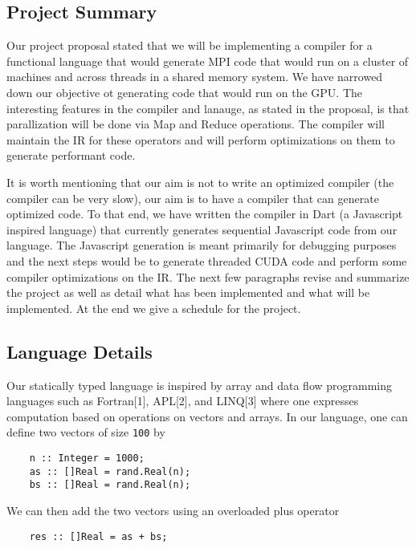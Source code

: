 \subsection{Project Summary}

Our project proposal stated that we will be implementing a compiler for
a functional language that would generate MPI code that would run on a
cluster of machines and across threads in a shared memory system. We
have narrowed down our objective ot generating code that would run on
the GPU. The interesting features in the compiler and lanauge, as stated
in the proposal, is that parallization will be done via Map and Reduce
operations. The compiler will maintain the IR for these operators and
will perform optimizations on them to generate performant code.

It is worth mentioning that our aim is not to write an optimized
compiler (the compiler can be very slow), our aim is to have a compiler
that can generate optimized code. To that end, we have written the
compiler in Dart (a Javascript inspired language) that currently
generates sequential Javascript code from our language. The Javascript
generation is meant primarily for debugging purposes and the next steps
would be to generate threaded CUDA code and perform some compiler
optimizations on the IR. The next few paragraphs revise and summarize
the project as well as detail what has been implemented and what will be
implemented. At the end we give a schedule for the project.

\subsection{Language Details}

Our statically typed language is inspired by array and data flow
programming languages such as Fortran{[}1{]}, APL{[}2{]}, and
LINQ{[}3{]} where one expresses computation based on operations on
vectors and arrays. In our language, one can define two vectors of size
\texttt{100} by

\begin{verbatim}
    n :: Integer = 1000;
    as :: []Real = rand.Real(n);
    bs :: []Real = rand.Real(n); 
\end{verbatim}

We can then add the two vectors using an overloaded plus operator

\begin{verbatim}
    res :: []Real = as + bs;
\end{verbatim}

